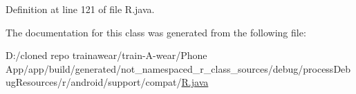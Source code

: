 Definition at line 121 of file R.\+java.



The documentation for this class was generated from the following file\+:\begin{DoxyCompactItemize}
\item 
D\+:/cloned repo trainawear/train-\/\+A-\/wear/\+Phone App/app/build/generated/not\+\_\+namespaced\+\_\+r\+\_\+class\+\_\+sources/debug/process\+Debug\+Resources/r/android/support/compat/\mbox{\hyperlink{process_debug_resources_2r_2android_2support_2compat_2_r_8java}{R.\+java}}\end{DoxyCompactItemize}
